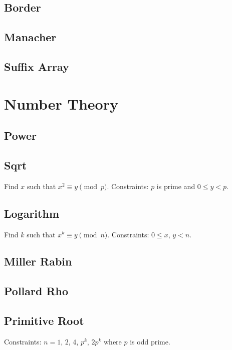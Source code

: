 \documentclass{article}
\begin{document}
\begin{multicols}{2}
    \subsection{Border}
    
    \subsection{Manacher}
    
    \subsection{Suffix Array}
    

    \section{Number Theory}
    \subsection{Power}
    
    \subsection{Sqrt}
    Find $x$ such that $x^2\equiv y\pmod p$.
    \newline Constraints: $p$ is prime and $0\le y<p$.
    
    \subsection{Logarithm}
    Find $k$ such that $x^k\equiv y\pmod n$.
    \newline Constraints: $0\le x$, $y<n$.
    
    \subsection{Miller Rabin}
    
    \subsection{Pollard Rho}
    
    \subsection{Primitive Root}
    Constraints: $n=1$, $2$, $4$, $p^k$, $2p^{k}$ where $p$ is odd prime.
    
    

\end{multicols}
\end{document}
